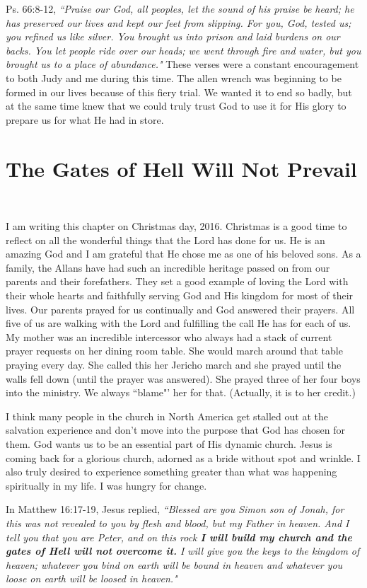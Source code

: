 \documentclass[oneside,12pt]{book}
\begin{document}
Ps. 66:8-12, \textit{``Praise our God, all peoples, let the sound of his praise be heard; he has preserved our lives and kept our feet from slipping. For you, God, tested us; you refined us like silver. You brought us into prison and laid burdens on our backs. You let people ride over our heads; we went through fire and water, but you brought us to a place of abundance."} These verses were a constant encouragement to both Judy and me during this time. The allen wrench was beginning to be formed in our lives because of this fiery trial. We wanted it to end so badly, but at the same time knew that we could truly trust God to use it for His glory to prepare us for what He had in store.


\chapter{The Gates of Hell Will Not Prevail}
\

I am writing this chapter on Christmas day, 2016. Christmas is a good time to reflect on all the wonderful things that the Lord has done for us. He is an amazing God and I am grateful that He chose me as one of his beloved sons. As a family, the Allans have had such an incredible heritage passed on from our parents and their forefathers. They set a good example of loving the Lord with their whole hearts and faithfully serving God and His kingdom for most of their lives. Our parents prayed for us continually and God answered their prayers. All five of us are walking with the Lord and fulfilling the call He has for each of us. My mother was an incredible intercessor who always had a stack of current prayer requests on her dining room table. She would march around that table praying every day. She called this her Jericho march and she prayed until the walls fell down (until the prayer was answered). She prayed three of her four boys into the ministry. We always ``blame"' her for that. (Actually, it is to her credit.)

I think many people in the church in North America get stalled out at the salvation experience and don't move into the purpose that God has chosen for them. God wants us to be an essential part of His dynamic church. Jesus is coming back for a glorious church, adorned as a bride without spot and wrinkle. I also truly desired to experience something greater than what was happening spiritually in my life. I was hungry for change.

In Matthew 16:17-19, Jesus replied, \textit{``Blessed are you Simon son of Jonah, for this was not revealed to you by flesh and blood, but my Father in heaven. And I tell you that you are Peter, and on this rock \textbf{I will build my church and the gates of Hell will not overcome it.} I will give you the keys to the kingdom of heaven; whatever you bind on earth will be bound in heaven and whatever you loose on earth will be loosed in heaven."}
\end{document}
